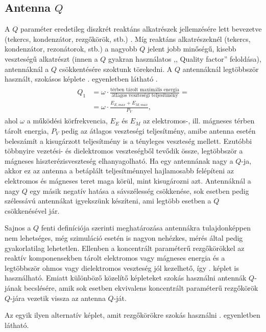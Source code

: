 		\subsection{Antenna $Q$}
		\label{sec:q}
		A $Q$ paraméter eredetileg diszkrét reaktáns alkatrészek jellemzésére lett bevezetve (tekercs, kondenzátor, rezgőkörök, stb.) \cite{story-of-q}. Míg reaktáns alkatrészeknél (tekercs, kondenzátor, rezonátorok, stb.) a nagyobb $Q$ jelent jobb minőségű, kisebb veszteségű alkatrészt (innen a $Q$ gyakran használatos ,, Quality factor'' feloldása), antennáknál a $Q$ csökkentésére szoktunk törekedni. A $Q$ antennáknál legtöbbször használt, szokásos képlete . egyenletben látható \cite{multi-band}.
		\begin{align}
			\begin{split}\label{equ:Q}
				Q_1 & = \omega \cdot \frac{\text{térben tárolt maximális energia}}{\text{átlagos veszteségi teljesítmény}} = \\
				& = \omega \cdot \frac{E_{E, max}+E_{M, max}}{P_V},
			\end{split}
		\end{align}
		ahol $\omega$ a működési körfrekvencia, $E_E$ és $E_M$ az elektromos-, ill. mágneses térben tárolt energia, $P_V$ pedig az átlagos veszteségi teljesítmény, amibe antenna esetén beleszámít a kisugárzott teljesítmény is a tényleges veszteség mellett. Ezutóbbi többnyire vezetési- és dielektromos veszteségből tevődik össze, legtöbbször a mágneses hiszterézisveszteség elhanyagolható. Ha egy antennának nagy a $Q$-ja, akkor ez az antenna a betáplált teljesítménnyel hajlamosabb felépíteni az elektromos és mágneses teret maga körül, mint kisugározni azt. Antennáknál a nagy $Q$ egy másik negatív hatása a sávszélesség csökkenése, sok esetben pedig szélessávú antennákat igyekszünk készíteni, ami legtöbb esetben a $Q$ csökkenésével jár.
		\par Sajnos a $Q$ fenti definíciója szerinti meghatározása antennákra tulajdonképpen nem lehetséges, még szimuláció esetén is nagyon nehézkes, mérés által pedig gyakorlatilag lehetetlen. Ellenben a koncentrált paraméterű rezgőkörökkel az reaktív komponensekben tárolt elektromos vagy mágneses energia és a legtöbbször ohmos vagy dielektromos veszteség jól kezelhető, így . képlet is használható. Emiatt különböző közelítő képleteket szokás használni antennák $Q$-jának becslésére, amik sok esetben ekvivalens koncentrált paraméterű rezgőkörök $Q$-jára vezetik vissza az antenna $Q$-ját.
		\par Az egyik ilyen alternatív képlet, amit rezgőkörökre szokás használni . egyenletben látható.
